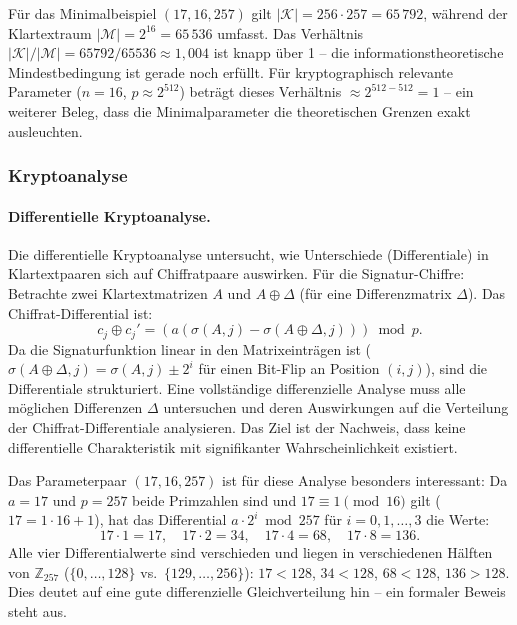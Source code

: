 ﻿\documentclass[a4paper,12pt]{scrreprt}
\theoremstyle{definition}
\begin{document}
Für das Minimalbeispiel $(17, 16, 257)$ gilt $|\mathcal{K}| = 256 \cdot 257 = 65\,792$, während der Klartextraum $|\mathcal{M}| = 2^{16} = 65\,536$ umfasst. Das Verhältnis $|\mathcal{K}|/|\mathcal{M}| = 65792/65536 \approx 1{,}004$ ist knapp über 1 -- die informationstheoretische Mindestbedingung ist gerade noch erfüllt. Für kryptographisch relevante Parameter ($n=16$, $p \approx 2^{512}$) beträgt dieses Verhältnis $\approx 2^{512-512} = 1$ -- ein weiterer Beleg, dass die Minimalparameter die theoretischen Grenzen exakt ausleuchten.

\subsubsection{Kryptoanalyse}

\paragraph{Differentielle Kryptoanalyse.}
Die differentielle Kryptoanalyse \cite{BS93} untersucht, wie Unterschiede (Differentiale) in Klartextpaaren sich auf Chiffratpaare auswirken. Für die Signatur-Chiffre: Betrachte zwei Klartextmatrizen $A$ und $A \oplus \Delta$ (für eine Differenzmatrix $\Delta$). Das Chiffrat-Differential ist:
\[
c_j \oplus c_j' = (a(\sigma(A,j) - \sigma(A\oplus\Delta,j)))\bmod p.
\]
Da die Signaturfunktion linear in den Matrixeinträgen ist ($\sigma(A\oplus\Delta,j) = \sigma(A,j) \pm 2^i$ für einen Bit-Flip an Position $(i,j)$), sind die Differentiale strukturiert. Eine vollständige differenzielle Analyse muss alle möglichen Differenzen $\Delta$ untersuchen und deren Auswirkungen auf die Verteilung der Chiffrat-Differentiale analysieren. Das Ziel ist der Nachweis, dass keine differentielle Charakteristik mit signifikanter Wahrscheinlichkeit existiert.

Das Parameterpaar $(17, 16, 257)$ ist für diese Analyse besonders interessant: Da $a = 17$ und $p = 257$ beide Primzahlen sind und $17 \equiv 1 \pmod{16}$ gilt ($17 = 1 \cdot 16 + 1$), hat das Differential $a \cdot 2^i \bmod 257$ für $i = 0, 1, \ldots, 3$ die Werte:
\[
17 \cdot 1 = 17, \quad 17 \cdot 2 = 34, \quad 17 \cdot 4 = 68, \quad 17 \cdot 8 = 136.
\]
Alle vier Differentialwerte sind verschieden und liegen in verschiedenen Hälften von $\mathbb{Z}_{257}$ ($\{0,\ldots,128\}$ vs.\ $\{129,\ldots,256\}$): $17 < 128$, $34 < 128$, $68 < 128$, $136 > 128$. Dies deutet auf eine gute differenzielle Gleichverteilung hin -- ein formaler Beweis steht aus.
\end{document}
